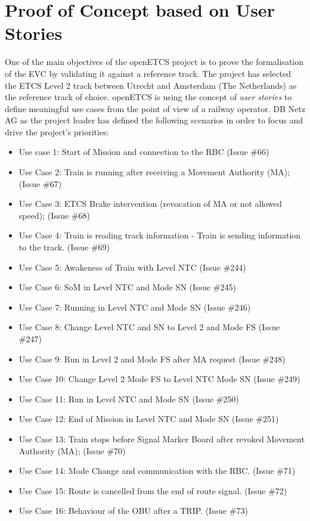 \documentclass{template/openetcs_article}
\begin{document}












\section{Proof of Concept based on User Stories}

One of the main objectives of the openETCS project is to prove the formalisation of the EVC by validating it against a reference track. The project has selected the ETCS Level 2 track between Utrecht and Amsterdam (The Netherlands) as the reference track of choice.\newline
openETCS is using the concept of \emph{user stories} to define meaningful use cases from the point of view of a railway operator. DB Netz AG as the project leader has defined the following scenarios in order to focus and drive the project's priorities:
\begin{itemize}
 \item{Use case 1: Start of Mission and connection to the RBC (Issue \#66)}
 \item{Use Case 2: Train is running after receiving a Movement Authority (MA); (Issue \#67)}
 \item{Use Case 3: ETCS Brake intervention (revocation of MA or not allowed speed); (Issue \#68)}
 \item{Use Case 4: Train is reading track information - Train is sending information to the track. (Issue \#69)}
 \item{Use Case 5: Awakeness of Train with Level NTC (Issue \#244)}
 \item{Use Case 6: SoM in Level NTC and Mode SN (Issue \#245)}
 \item{Use Case 7: Running in Level NTC and Mode SN (Issue \#246)}
 \item{Use Case 8: Change Level NTC and SN to Level 2 and Mode FS (Issue \#247)}
 \item{Use Case 9: Run in Level 2 and Mode FS after MA request (Issue \#248)}
 \item{Use Case 10: Change Level 2 Mode FS to Level NTC Mode SN (Issue \#249)}
 \item{Use Case 11: Run in Level NTC and Mode SN (Issue \#250)}
 \item{Use Case 12: End of Mission in Level NTC and Mode SN (Issue \#251)}
 \item{Use Case 13: Train stops before Signal Marker Board after revoked Movement Authority (MA); (Issue \#70)}
 \item{Use Case 14: Mode Change and communication with the RBC. (Issue \#71)}
 \item{Use Case 15: Route is cancelled from the end of route signal. (Issue \#72)}
 \item{Use Case 16: Behaviour of the OBU after a TRIP. (Issue \#73)}
\end{itemize}
\end{document}

